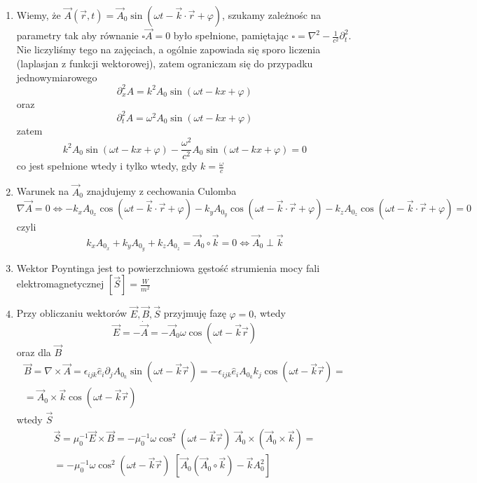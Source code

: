 \documentclass[a4paper,12pt]{article}
\begin{document}
	\begin{enumerate}
		\item Wiemy, że $\vec{A}(\vec{r},t) = \vec{A}_0 \sin(\omega t - \vec{k}\cdot\vec{r}+\varphi)$, szukamy zależnośc na parametry tak aby
		równanie $\square\vec{A}=0$ było spełnione, pamiętając $\square = \nabla^2 - \frac{1}{c^2}\partial_t^2$.\\
		Nie liczyliśmy tego na zajęciach, a ogólnie zapowiada się sporo liczenia (laplasjan z funkcji wektorowej), zatem ograniczam się do przypadku jednowymiarowego
		$$
			\partial_x^2 A = k^2 A_0 \sin(\omega t - kx +\varphi)
		$$
		oraz
		$$
			\partial_t^2 A = \omega^2 A_0\sin(\omega t - kx+\varphi)
		$$
		zatem 
		$$
			 k^2 A_0 \sin(\omega t - kx +\varphi) - \frac{\omega^2}{c^2}A_0\sin(\omega t - kx+\varphi) = 0 
		$$
		co jest spełnione wtedy i tylko wtedy, gdy $k = \frac{\omega}{c}$
		\item Warunek na $\vec{A}_0$ znajdujemy z cechowania Culomba
		$$
			\nabla \vec{A} = 0 \Leftrightarrow -k_xA_{0_x} \cos(\omega t - \vec{k}\cdot\vec{r}+\varphi) - k_yA_{0_y}\cos(\omega t - \vec{k}\cdot\vec{r}+\varphi)
			-k_z A_{0_z} \cos(\omega t - \vec{k}\cdot\vec{r}+\varphi) = 0 
		$$
		czyli 
		$$
			k_xA_{0_x} + k_yA_{0_y} + k_zA_{0_z} = \vec{A}_0 \circ \vec{k} = 0  \Leftrightarrow \vec{A}_0 \perp \vec{k}
		$$
		\item Wektor Poyntinga jest to powierzchniowa gęstość strumienia mocy fali elektromagnetycznej $[\vec{S}] = \frac{W}{m^2}$
		\item Przy obliczaniu wektorów $\vec{E},\vec{B},\vec{S}$ przyjmuję fazę $\varphi =0$, wtedy
		$$
			\vec{E} = -\dot{\vec{A}} = -\vec{A}_0\omega\cos(\omega t -\vec{k}\vec{r})
		$$
		oraz dla $\vec{B}$
		$$
		\begin{array}{l}
			\vec{B} = \nabla\times\vec{A} = \epsilon_{ijk}\hat{e}_i\partial_j A_{0_k}\sin(\omega t-\vec{k}\vec{r}) = -\epsilon_{ijk}\hat{e}_i A_{0_k}k_j\cos(\omega t-\vec{k}\vec{r}) =\\
			=\vec{A}_0\times\vec{k}\cos(\omega t-\vec{k}\vec{r})
		\end{array}
		$$
		wtedy $\vec{S}$
		$$
		\begin{array}{l}
			\vec{S}=\mu_0^{-1}\vec{E}\times\vec{B} = -\mu_0^{-1}\omega\cos^2(\omega t-\vec{k}\vec{r})\,\,\vec{A}_0\times(\vec{A}_0\times\vec{k}) =\\
			= -\mu_0^{-1}\omega\cos^2(\omega t-\vec{k}\vec{r})\,\, \left[\vec{A}_0(\vec{A}_0\circ\vec{k})-\vec{k}A_0^2\right]
		\end{array}
		$$
	\end{enumerate}
\end{document}
